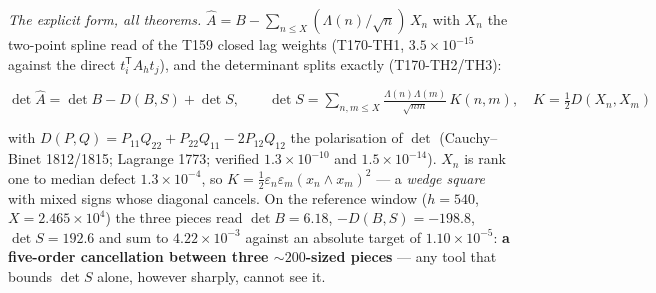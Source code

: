 \documentclass[11pt,a4paper]{article}
\begin{document}
\emph{The explicit form, all theorems.} $\hat A=B-\sum_{n\le X}
(\Lambda(n)/\sqrt n)\,X_n$ with $X_n$ the two-point spline read of the T159
closed lag weights (T170-TH1, $3.5\times10^{-15}$ against the direct
$t_i^{\mathsf T}A_ht_j$), and the determinant splits exactly
(T170-TH2/TH3):
\begin{keyeq}$\displaystyle
\det\hat A=\det B-D(B,S)+\det S,\qquad
\det S=\!\!\sum_{n,m\le X}\!\frac{\Lambda(n)\Lambda(m)}{\sqrt{nm}}\,K(n,m),
\quad K=\tfrac12 D(X_n,X_m)$
\end{keyeq}
\noindent with $D(P,Q)=P_{11}Q_{22}+P_{22}Q_{11}-2P_{12}Q_{12}$ the
polarisation of $\det$ (Cauchy--Binet 1812/1815; Lagrange 1773; verified
$1.3\times10^{-10}$ and $1.5\times10^{-14}$). $X_n$ is rank one to median
defect $1.3\times10^{-4}$, so $K=\tfrac12\varepsilon_n\varepsilon_m
(x_n\wedge x_m)^2$ --- a \emph{wedge square} with mixed signs whose diagonal
cancels. On the reference window ($h=540$, $X=2.465\times10^{4}$) the three
pieces read $\det B=6.18$, $-D(B,S)=-198.8$, $\det S=192.6$ and sum to
$4.22\times10^{-3}$ against an absolute target of $1.10\times10^{-5}$:
\textbf{a five-order cancellation between three ${\sim}200$-sized pieces} ---
any tool that bounds $\det S$ alone, however sharply, cannot see it.
\end{document}
